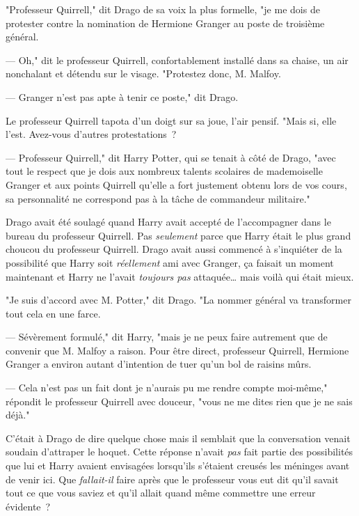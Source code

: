 \later

"Professeur Quirrell," dit Drago de sa voix la plus formelle, "je me dois de protester contre la nomination de Hermione Granger au poste de troisième général.

--- Oh," dit le professeur Quirrell, confortablement installé dans sa chaise, un air nonchalant et détendu sur le visage. "Protestez donc, M. Malfoy.

--- Granger n'est pas apte à tenir ce poste," dit Drago.

Le professeur Quirrell tapota d'un doigt sur sa joue, l'air pensif. "Mais si, elle l'est. Avez-vous d'autres protestations~?

--- Professeur Quirrell," dit Harry Potter, qui se tenait à côté de Drago, "avec tout le respect que je dois aux nombreux talents scolaires de mademoiselle Granger et aux points Quirrell qu'elle a fort justement obtenu lors de vos cours, sa personnalité ne correspond pas à la tâche de commandeur militaire."

Drago avait été soulagé quand Harry avait accepté de l'accompagner dans le bureau du professeur Quirrell. Pas \emph{seulement} parce que Harry était le plus grand choucou du professeur Quirrell. Drago avait aussi commencé à s'inquiéter de la possibilité que Harry soit \emph{réellement} ami avec Granger, ça faisait un moment maintenant et Harry ne l'avait \emph{toujours pas} attaquée… mais voilà qui était mieux.

"Je suis d'accord avec M. Potter," dit Drago. "La nommer général va transformer tout cela en une farce.

--- Sévèrement formulé," dit Harry, "mais je ne peux faire autrement que de convenir que M. Malfoy a raison. Pour être direct, professeur Quirrell, Hermione Granger a environ autant d'intention de tuer qu'un bol de raisins mûrs.

--- Cela n'est pas un fait dont je n'aurais pu me rendre compte moi-même," répondit le professeur Quirrell avec douceur, "vous ne me dites rien que je ne sais déjà."

C'était à Drago de dire quelque chose mais il semblait que la conversation venait soudain d'attraper le hoquet. Cette réponse n'avait \emph{pas} fait partie des possibilités que lui et Harry avaient envisagées lorsqu'ils s'étaient creusés les méninges avant de venir ici. Que \emph{fallait-il} faire après que le professeur vous eut dit qu'il savait tout ce que vous saviez et qu'il allait quand même commettre une erreur évidente~?

